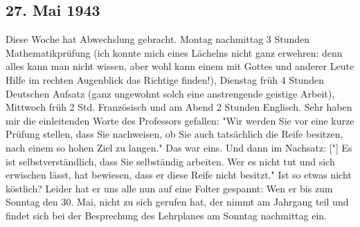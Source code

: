 \subsection{27. Mai 1943}

Diese Woche hat Abwechslung gebracht.
Montag nachmittag 3 Stunden Mathematikpr\"{u}fung (ich konnte mich eines L\"{a}chelns nicht ganz erwehren: denn alles kann man nicht wissen, aber wohl kann einem mit Gottes und anderer Leute Hilfe im rechten Augenblick das Richtige finden!), Dienstag fr\"{u}h 4 Stunden Deutschen Aufsatz (ganz ungewohnt solch eine anstrengende geistige Arbeit), Mittwoch fr\"{u}h 2 Std. Franz\"{o}sisch und am Abend 2 Stunden Englisch.
Sehr haben mir die einleitenden Worte des Professors gefallen: "Wir werden Sie vor eine kurze Pr\"{u}fung stellen, dass Sie nachweisen, ob Sie auch tats\"{a}chlich die Reife besitzen, nach einem so hohen Ziel zu langen."
Das war eins.
Und dann im Nachsatz: {\color{red} ["] }Es ist selbstverst\"{a}ndlich, dass Sie selbst\"{a}ndig arbeiten.
Wer es nicht tut und sich erwischen l\"{a}sst, hat bewiesen, dass er diese Reife nicht besitzt."
Ist so etwas nicht k\"{o}stlich?
Leider hat er uns alle nun auf eine Folter gespannt: Wen er bis zum Sonntag den 30. Mai, nicht zu sich gerufen hat, der nimmt am Jahrgang teil und findet sich bei der Besprechung des Lehrplanes am Sonntag nachmittag ein.

\clearpage
